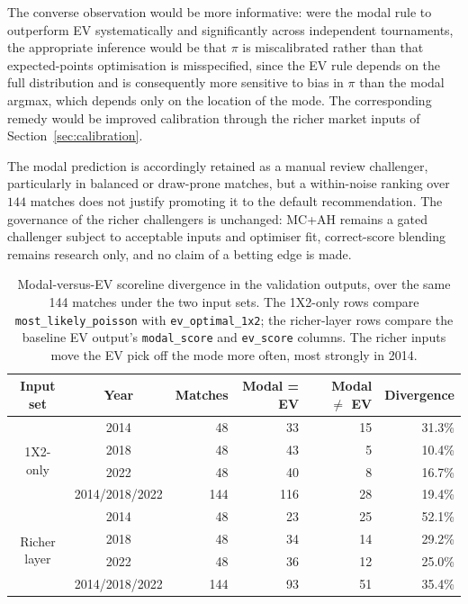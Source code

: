 \documentclass[11pt]{article}
\begin{document}
The converse observation would be more informative: were the modal rule to
outperform EV systematically and significantly across independent tournaments, the appropriate
inference would be that $\pi$ is miscalibrated rather than that expected-points optimisation is
misspecified, since the EV rule depends on the full distribution and is consequently more sensitive
to bias in $\pi$ than the modal argmax, which depends only on the location of the mode. The
corresponding remedy would be improved calibration through the richer market inputs of
Section~\ref{sec:calibration}.

The modal prediction is accordingly retained as a manual review challenger, particularly in balanced or draw-prone matches,
but a within-noise ranking over $144$ matches does not justify promoting it to the default recommendation.
The governance of the richer challengers is unchanged: MC+AH remains a gated challenger subject to
acceptable inputs and optimiser fit, correct-score blending remains research only, and no claim of
a betting edge is made.

\begin{table}[htbp]
\centering
\small
\begin{tabular}{ccrrrr}
\toprule
Input set & Year & Matches & Modal = EV & Modal $\neq$ EV & Divergence \\
\midrule
\multirow{4}{*}{1X2-only}
& 2014           & 48  & 33  & 15 & 31.3\% \\
& 2018           & 48  & 43  & 5  & 10.4\% \\
& 2022           & 48  & 40  & 8  & 16.7\% \\
& 2014/2018/2022 & 144 & 116 & 28 & 19.4\% \\
\midrule
\multirow{4}{*}{Richer layer}
& 2014           & 48  & 23  & 25 & 52.1\% \\
& 2018           & 48  & 34  & 14 & 29.2\% \\
& 2022           & 48  & 36  & 12 & 25.0\% \\
& 2014/2018/2022 & 144 & 93  & 51 & 35.4\% \\
\bottomrule
\end{tabular}
\caption{Modal-versus-EV scoreline divergence in the validation outputs, over the same 144
matches under the two input sets. The 1X2-only rows compare \texttt{most\_likely\_poisson} with
\texttt{ev\_optimal\_1x2}; the richer-layer rows compare the baseline EV output's
\texttt{modal\_score} and \texttt{ev\_score} columns. The richer inputs move the EV pick off the
mode more often, most strongly in 2014.}
\label{tab:modal-ev-divergence}
\end{table}
\end{document}
